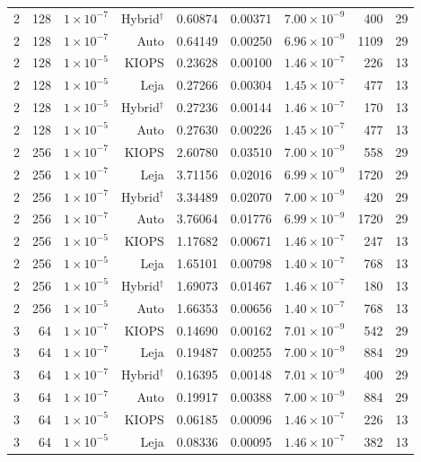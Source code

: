 \begin{longtable}{@{}rrrrrrrrr@{}}
2 & 128 & $1\times10^{-7}$ & Hybrid$^\dagger$ & 0.60874 & 0.00371 & $7.00\times10^{-9}$ & 400 & 29 \\
2 & 128 & $1\times10^{-7}$ & Auto & 0.64149 & 0.00250 & $6.96\times10^{-9}$ & 1109 & 29 \\
2 & 128 & $1\times10^{-5}$ & KIOPS & 0.23628 & 0.00100 & $1.46\times10^{-7}$ & 226 & 13 \\
2 & 128 & $1\times10^{-5}$ & Leja & 0.27266 & 0.00304 & $1.45\times10^{-7}$ & 477 & 13 \\
2 & 128 & $1\times10^{-5}$ & Hybrid$^\dagger$ & 0.27236 & 0.00144 & $1.46\times10^{-7}$ & 170 & 13 \\
2 & 128 & $1\times10^{-5}$ & Auto & 0.27630 & 0.00226 & $1.45\times10^{-7}$ & 477 & 13 \\
2 & 256 & $1\times10^{-7}$ & KIOPS & 2.60780 & 0.03510 & $7.00\times10^{-9}$ & 558 & 29 \\
2 & 256 & $1\times10^{-7}$ & Leja & 3.71156 & 0.02016 & $6.99\times10^{-9}$ & 1720 & 29 \\
2 & 256 & $1\times10^{-7}$ & Hybrid$^\dagger$ & 3.34489 & 0.02070 & $7.00\times10^{-9}$ & 420 & 29 \\
2 & 256 & $1\times10^{-7}$ & Auto & 3.76064 & 0.01776 & $6.99\times10^{-9}$ & 1720 & 29 \\
2 & 256 & $1\times10^{-5}$ & KIOPS & 1.17682 & 0.00671 & $1.46\times10^{-7}$ & 247 & 13 \\
2 & 256 & $1\times10^{-5}$ & Leja & 1.65101 & 0.00798 & $1.40\times10^{-7}$ & 768 & 13 \\
2 & 256 & $1\times10^{-5}$ & Hybrid$^\dagger$ & 1.69073 & 0.01467 & $1.46\times10^{-7}$ & 180 & 13 \\
2 & 256 & $1\times10^{-5}$ & Auto & 1.66353 & 0.00656 & $1.40\times10^{-7}$ & 768 & 13 \\
3 & 64 & $1\times10^{-7}$ & KIOPS & 0.14690 & 0.00162 & $7.01\times10^{-9}$ & 542 & 29 \\
3 & 64 & $1\times10^{-7}$ & Leja & 0.19487 & 0.00255 & $7.00\times10^{-9}$ & 884 & 29 \\
3 & 64 & $1\times10^{-7}$ & Hybrid$^\dagger$ & 0.16395 & 0.00148 & $7.01\times10^{-9}$ & 400 & 29 \\
3 & 64 & $1\times10^{-7}$ & Auto & 0.19917 & 0.00388 & $7.00\times10^{-9}$ & 884 & 29 \\
3 & 64 & $1\times10^{-5}$ & KIOPS & 0.06185 & 0.00096 & $1.46\times10^{-7}$ & 226 & 13 \\
3 & 64 & $1\times10^{-5}$ & Leja & 0.08336 & 0.00095 & $1.46\times10^{-7}$ & 382 & 13 \\

\end{longtable}

